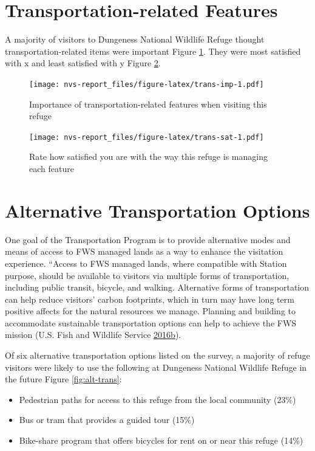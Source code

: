 \documentclass[]{book}
\providecommand{\tightlist}{%
  \setlength{\itemsep}{0pt}\setlength{\parskip}{0pt}}
\begin{document}
\section{Transportation-related
Features}\label{transportation-related-features}

A majority of visitors to Dungeness National Wildlife Refuge thought
transportation-related items were important Figure \ref{fig:trans-imp}.
They were most satisfied with x and least satisfied with y Figure
\ref{fig:trans-sat}.

\begin{figure}
\centering
\texttt{[image: nvs-report\_files/figure-latex/trans-imp-1.pdf]}
\caption{\label{fig:trans-imp}Importance of transportation-related features
when visiting this refuge}
\end{figure}

\begin{figure}
\centering
\texttt{[image: nvs-report\_files/figure-latex/trans-sat-1.pdf]}
\caption{\label{fig:trans-sat}Rate how satisfied you are with the way this
refuge is managing each feature}
\end{figure}

\section{Alternative Transportation
Options}\label{alternative-transportation-options}

One goal of the Transportation Program is to provide alternative modes
and means of access to FWS managed lands as a way to enhance the
visitation experience. ``Access to FWS managed lands, where compatible
with Station purpose, should be available to visitors via multiple forms
of transportation, including public transit, bicycle, and walking.
Alternative forms of transportation can help reduce visitors' carbon
footprints, which in turn may have long term positive affects for the
natural resources we manage. Planning and building to accommodate
sustainable transportation options can help to achieve the FWS mission
(U.S. Fish and Wildlife Service
\protect\hyperlink{ref-USFWS2016b}{2016}\protect\hyperlink{ref-USFWS2016b}{b}).

Of six alternative transportation options listed on the survey, a
majority of refuge visitors were likely to use the following at
Dungeness National Wildlife Refuge in the future Figure
\ref{fig:alt-trans}:

\begin{itemize}
\tightlist
\item
  Pedestrian paths for access to this refuge from the local community
  (23\%)
\item
  Bus or tram that provides a guided tour (15\%)
\item
  Bike-share program that offers bicycles for rent on or near this
  refuge (14\%)
\end{itemize}
\end{document}
